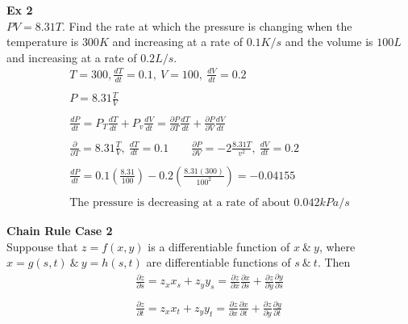 \documentclass{article}
\begin{document}
  \textbf{Ex 2}\\
  $ PV =8.31T$. Find the rate at which the pressure is changing when the temperature is $ 300K $ and increasing at a rate of $ 0.1K/s $ and the volume is $ 100L $ and increasing at a rate of $ 0.2L/s $.
  \[
    \begin{gathered}
    T=300, \frac{dT}{dt}=0.1,~V=100,~\frac{dV}{dt}=0.2\\
    ~\\
    P=8.31\frac{T}{V} \\
    ~\\
  \frac{dP}{dt}= P_{T}\frac{dT}{dt}+ P_{v}\frac{dV}{dt} = \frac{\partial P}{\partial T} \frac{dT}{dt}+\frac{\partial P}{\partial V} \frac{dV}{dt}\\
  ~\\
  \frac{\partial}{\partial T}= 8.31\frac{T}{V},~\frac{dT}{dt}= 0.1  \qquad \frac{\partial P}{\partial V}=-2\frac{8.31T}{v^{2} },~\frac{dV}{dt} =0.2\\
  ~\\
  \frac{dP}{dt} = 0.1 (\frac{8.31}{100}) -0.2(\frac{8.31(300)}{100^{2}})=\boxed{-0.04155}\\
  ~\\
  \text{The pressure is decreasing at a rate of about } 0.042kPa/s  
    \end{gathered}
  \]
 
  \textbf{Chain Rule Case 2}\\
  Suppouse that $ z=f(x,y) $ is a differentiable function of $ x ~\&~ y $, where $ x=g(s,t) ~\&~ y=h(s,t)$ are differentiable functions of $ s ~\&~ t $. Then
  \[
    \begin{gathered}
    \frac{\partial z}{\partial s} = z_{x}x_{s}+z_{y}y_{s} = \frac{\partial z}{\partial x} \frac{\partial x}{\partial s} +\frac{\partial z}{\partial y} \frac{\partial y}{\partial s}\\
    ~\\
    \frac{\partial z}{\partial t} = z_{x} x_{t}+z_{y}y_{t} = \frac{\partial z}{\partial x} \frac{\partial x}{\partial t} + \frac{\partial z}{\partial y} \frac{\partial y}{\partial t}    
    \end{gathered}
  \]
\end{document}
